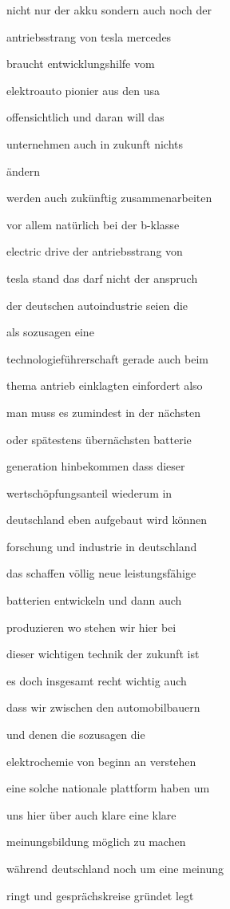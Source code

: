 \documentclass[a4paper, 11pt]{book} %
\begin{document}
nicht nur der akku sondern auch noch der

antriebsstrang von tesla mercedes

braucht entwicklungshilfe vom

elektroauto pionier aus den usa

offensichtlich und daran will das

unternehmen auch in zukunft nichts

ändern

werden auch zukünftig zusammenarbeiten

vor allem natürlich bei der b-klasse

electric drive der antriebsstrang von

tesla stand das darf nicht der anspruch

der deutschen autoindustrie seien die

als sozusagen eine

technologieführerschaft gerade auch beim

thema antrieb einklagten einfordert also

man muss es zumindest in der nächsten

oder spätestens übernächsten batterie

generation hinbekommen dass dieser

wertschöpfungsanteil wiederum in

deutschland eben aufgebaut wird können

forschung und industrie in deutschland

das schaffen völlig neue leistungsfähige

batterien entwickeln und dann auch

produzieren wo stehen wir hier bei

dieser wichtigen technik der zukunft ist

es doch insgesamt recht wichtig auch

dass wir zwischen den automobilbauern

und denen die sozusagen die

elektrochemie von beginn an verstehen

eine solche nationale plattform haben um

uns hier über auch klare eine klare

meinungsbildung möglich zu machen

während deutschland noch um eine meinung

ringt und gesprächskreise gründet legt
\end{document}
